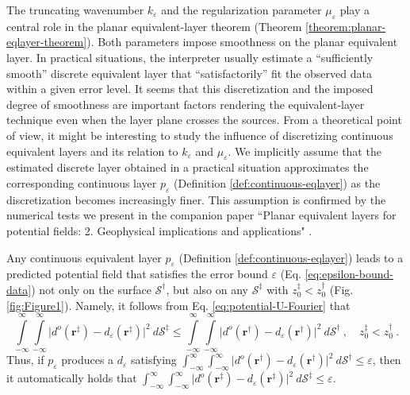 \begin{remark}
	\label{rm:remark2}
	The truncating wavenumber $k_{\varepsilon}$ and the regularization parameter $\mu_{\varepsilon}$ 
	play a central role in the planar equivalent-layer theorem (Theorem \ref{theorem:planar-eqlayer-theorem}). 
	Both parameters impose smoothness on the planar equivalent layer. 
	In practical situations, the interpreter usually estimate a ``sufficiently smooth'' discrete equivalent layer 
	that ``satisfactorily'' fit the observed data within a given error level. 
	It seems that this discretization and the imposed degree of smoothness are important factors rendering 
	the equivalent-layer technique even when the layer plane crosses the sources.
	From a theoretical point of view, it might be interesting to study the influence of
	discretizing continuous equivalent layers and its relation to $k_{\varepsilon}$ and $\mu_{\varepsilon}$. 
	We implicitly assume that the estimated discrete layer obtained in a practical situation 
	approximates the corresponding continuous layer $p_{\varepsilon}$ (Definition \ref{def:continuous-eqlayer}) as the discretization becomes increasingly finer. 
	This assumption is confirmed by the numerical tests we present in the companion paper 
	``Planar equivalent layers for potential fields: 2. Geophysical implications and applications" .
\end{remark}

\begin{remark}
	\label{rm:remark3}
	Any continuous equivalent layer $p_{\varepsilon}$ (Definition \ref{def:continuous-eqlayer}) leads to a predicted 
	potential field that satisfies
	the error bound $\varepsilon$ (Eq. \ref{eq:epsilon-bound-data}) not only on the surface $\mathcal{S}^{\dagger}$, but also 
	on any $\mathcal{S}^{\ddagger}$ with $z^{\ddagger}_{0} < z^{\dagger}_{0}$ (Fig. \ref{fig:Figure1}). 
	Namely, it follows from Eq. \ref{eq:potential-U-Fourier} that
	\begin{equation}
		\int\limits_{-\infty}^{\infty} \int\limits_{-\infty}^{\infty}
		\vert d^{o}(\mathbf{r}^{\ddagger}) - d_{\varepsilon}(\mathbf{r}^{\ddagger})
		\vert^{2} \: d\mathcal{S}^{\ddagger} \le
		\int\limits_{-\infty}^{\infty} \int\limits_{-\infty}^{\infty}
		\vert d^{o}(\mathbf{r}^{\dagger}) - d_{\varepsilon}(\mathbf{r}^{\dagger})
		\vert^{2} \: d\mathcal{S}^{\dagger} \: ,
		\quad z^{\ddagger}_{0} < z^{\dagger}_{0} \: .
		\label{eq:error-bound-upper-planes}
	\end{equation}
	Thus, if $p_{\varepsilon}$ produces a $d_{\varepsilon}$ satisfying 
	$\int_{-\infty}^{\infty} \int_{-\infty}^{\infty} \vert d^{o}(\mathbf{r}^{\dagger}) - d_{\varepsilon}(\mathbf{r}^{\dagger}) 
	\vert^{2} \: d\mathcal{S}^{\dagger} \le \varepsilon$, then it automatically holds that 
	$\int_{-\infty}^{\infty} \int_{-\infty}^{\infty} \vert d^{o}(\mathbf{r}^{\ddagger}) - d_{\varepsilon}(\mathbf{r}^{\ddagger}) 
	\vert^{2} \: d\mathcal{S}^{\ddagger} \le \varepsilon$.
\end{remark}

